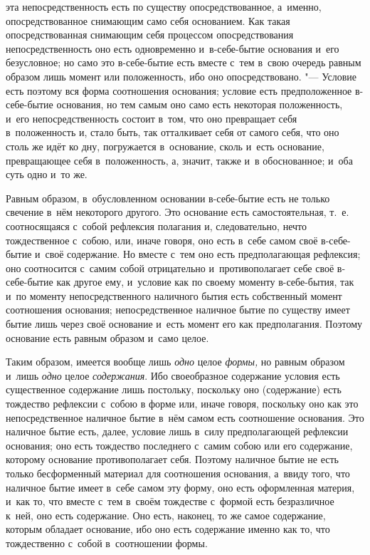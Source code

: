 эта непосредственность есть по существу опосредствованное, а~именно,
опосредствованное снимающим само себя основанием. Как такая
опосредствованная снимающим себя процессом опосредствования
непосредственность оно есть одновременно и~в-себе-бытие основания и~его
безусловное; но само это в-себе-бытие есть вместе с~тем в~свою очередь
равным образом лишь момент или положенность, ибо оно опосредствовано. "---
Условие есть поэтому вся форма соотношения основания; условие есть
предположенное в-себе-бытие основания, но тем самым оно само есть некоторая
положенность, и~его непосредственность состоит в~том, что оно превращает
себя в~положенность и, стало быть, так отталкивает себя от самого себя, что
оно столь же идёт ко дну, погружается в~основание, сколь и~есть основание,
превращающее себя в~положенность, а, значит, также и~в обоснованное; и~оба
суть одно и~то же.

Равным образом, в~обусловленном основании в-себе-бытие есть не только
свечение в~нём некоторого другого. Это основание есть самостоятельная,
т.~е. соотносящаяся с~собой рефлексия полагания и, следовательно, нечто
тождественное с~собою, или, иначе говоря, оно есть в~себе самом своё
в-себе-бытие и~своё содержание. Но вместе с~тем оно есть предполагающая
рефлексия; оно соотносится с~самим собой отрицательно и~противополагает
себе своё в-себе-бытие как другое ему, и~условие как по своему моменту
в-себе-бытия, так и~по моменту непосредственного наличного бытия есть
собственный момент соотношения основания; непосредственное наличное бытие
по существу имеет бытие лишь через своё основание и~есть момент его как
предполагания. Поэтому основание есть равным образом и~само целое.

Таким образом, имеется вообще лишь {\em одно} целое
{\em формы,} но равным образом и~лишь
{\em одно} целое {\em содержания}.
Ибо своеобразное содержание условия есть существенное содержание лишь
постольку, поскольку оно (содержание) есть тождество рефлексии с~собою в
форме или, иначе говоря, поскольку оно как это непосредственное наличное
бытие в~нём самом есть соотношение основания. Это наличное бытие есть,
далее, условие лишь в~силу предполагающей рефлексии основания; оно есть
тождество последнего с~самим собою или его содержание, которому основание
противополагает себя. Поэтому наличное бытие не есть только бесформенный
материал для соотношения основания, а~ввиду того, что наличное бытие имеет
в~себе самом эту форму, оно есть оформленная материя, и~как то, что вместе
с~тем в~своём тождестве с~формой есть безразличное к~ней, оно есть
содержание. Оно есть, наконец, то же самое содержание, которым обладает
основание, ибо оно есть содержание именно как то, что тождественно с~собой
в~соотношении формы.

